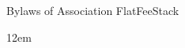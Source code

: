 \begin{titlepage}

    \vspace*{\fill} %

    \begin{flushright}
    {Bylaws of Association FlatFeeStack} \\ [1.5cm]
    \end{flushright}

    \leftskip12em
    \vspace{1.5\baselineskip}

\end{titlepage}
